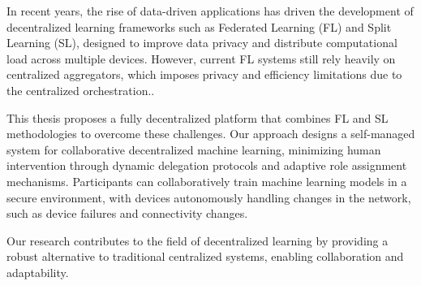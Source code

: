 
%

In recent years, the rise of data-driven applications has driven the development of decentralized learning frameworks such as Federated Learning (FL) and Split Learning (SL), designed to improve data privacy and distribute computational load across multiple devices. However, current FL systems still rely heavily on centralized aggregators, which imposes privacy and efficiency limitations due to the centralized orchestration.. 

This thesis proposes a fully decentralized platform that combines FL and SL methodologies to overcome these challenges. 
Our approach designs a self-managed system for collaborative decentralized machine learning, minimizing human intervention through dynamic delegation protocols and adaptive role assignment mechanisms. Participants can collaboratively train machine learning models in a secure environment, with devices autonomously handling changes in the network, such as device failures and connectivity changes.

Our research contributes to the field of decentralized learning by providing a robust alternative to traditional centralized systems, enabling collaboration and adaptability.

